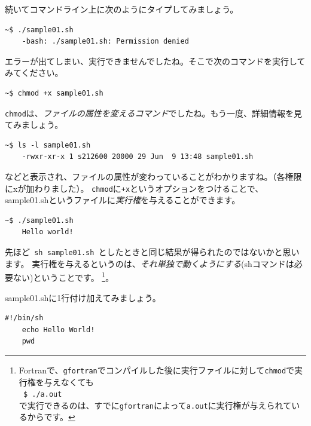 \documentclass[a4j]{ltjsreport}
\begin{document}
    続いてコマンドライン上に次のようにタイプしてみましょう。
    \begin{lstlisting}[numbers=none]
    ~$ ./sample01.sh
    -bash: ./sample01.sh: Permission denied
    \end{lstlisting}

    エラーが出てしまい、実行できませんでしたね。そこで次のコマンドを実行してみてください。
    \begin{lstlisting}[numbers=none]
    ~$ chmod +x sample01.sh
    \end{lstlisting}

    \texttt{chmod}は、\emph{ファイルの属性を変えるコマンド}でしたね。もう一度、詳細情報を見てみましょう。
    \begin{lstlisting}[numbers=none]
    ~$ ls -l sample01.sh
    -rwxr-xr-x 1 s212600 20000 29 Jun  9 13:48 sample01.sh
    \end{lstlisting}
    などと表示され、ファイルの属性が変わっていることがわかりますね。（各権限にxが加わりました）。
    \texttt{chmod}に\texttt{+x}というオプションをつけることで、
    sample01.shというファイルに\emph{実行権}を与えることができます。
    \begin{lstlisting}[numbers=none]
    ~$ ./sample01.sh
    Hello world!
    \end{lstlisting}
    先ほど\verb| sh sample01.sh |としたときと同じ結果が得られたのではないかと思います。
    実行権を与えるというのは、\emph{それ単独で動くようにする}(shコマンドは必要ない)ということです。
    \footnote{Fortranで、\texttt{gfortran}でコンパイルした後に実行ファイルに対して\texttt{chmod}で実行権を与えなくても
    \\
        \texttt{~\$ ./a.out}
    \\
    で実行できるのは、すでに\texttt{gfortran}によって\texttt{a.out}に実行権が与えられているからです。}。

    sample01.shに1行付け加えてみましょう。
    \begin{lstlisting}[caption=sample01.sh改]
    #!/bin/sh
    echo Hello World!
    pwd
    \end{lstlisting}
\end{document}
